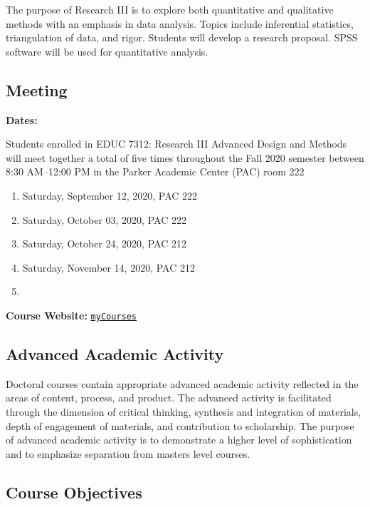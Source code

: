 \documentclass[
]{article}
\begin{document}
The purpose of Research III is to explore both quantitative and
qualitative methods with an emphasis in data analysis. Topics include
inferential statistics, triangulation of data, and rigor. Students will
develop a research proposal. SPSS software will be used for quantitative
analysis.

\subsection{Meeting}

\textbf{Dates:}

Students enrolled in EDUC 7312: Research III Advanced Design and Methods
will meet together a total of five times throughout the Fall 2020
semester between 8:30 AM--12:00 PM in the Parker Academic Center (PAC)
room 222

\begin{enumerate}
\def\labelenumi{\arabic{enumi}.}
\item
  Saturday, September 12, 2020, PAC 222
\item
  Saturday, October 03, 2020, PAC 222
\item
  Saturday, October 24, 2020, PAC 212
\item
  Saturday, November 14, 2020, PAC 212
\item
\end{enumerate}

\textbf{Course Website:}
\texttt{\href{https://mycourses.umhb.edu/courses/23599}{myCourses}}

\newpage
\subsection{Advanced Academic Activity}

Doctoral courses contain appropriate advanced academic activity
reflected in the areas of content, process, and product. The advanced
activity is facilitated through the dimension of critical thinking,
synthesis and integration of materials, depth of engagement of
materials, and contribution to scholarship. The purpose of advanced
academic activity is to demonstrate a higher level of sophistication and
to emphasize separation from masters level courses.

\subsection{Course Objectives}
\end{document}
